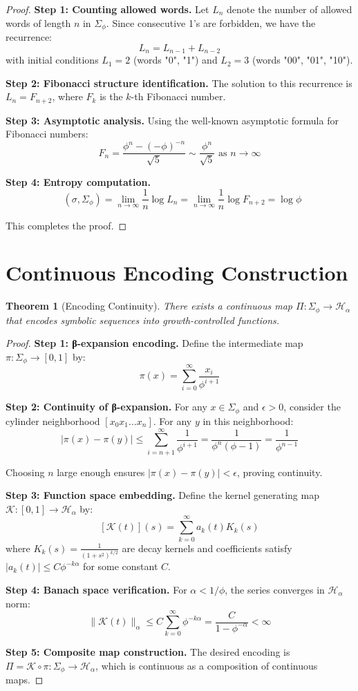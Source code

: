 \documentclass[12pt]{article}
\theoremstyle{plain}
\newtheorem{theorem}{Theorem}[section]
\theoremstyle{definition}
\DeclareMathOperator{\htop}{h_{top}}
\begin{document}
\begin{proof}
\textbf{Step 1: Counting allowed words.}
Let $L_n$ denote the number of allowed words of length $n$ in $\Sigma_\phi$. Since consecutive 1's are forbidden, we have the recurrence:
$$L_n = L_{n-1} + L_{n-2}$$
with initial conditions $L_1 = 2$ (words "0", "1") and $L_2 = 3$ (words "00", "01", "10").

\textbf{Step 2: Fibonacci structure identification.}
The solution to this recurrence is $L_n = F_{n+2}$, where $F_k$ is the $k$-th Fibonacci number.

\textbf{Step 3: Asymptotic analysis.}
Using the well-known asymptotic formula for Fibonacci numbers:
$$F_n = \frac{\phi^n - (-\phi)^{-n}}{\sqrt{5}} \sim \frac{\phi^n}{\sqrt{5}} \text{ as } n \to \infty$$

\textbf{Step 4: Entropy computation.}
$$\htop(\sigma, \Sigma_\phi) = \lim_{n \to \infty} \frac{1}{n} \log L_n = \lim_{n \to \infty} \frac{1}{n} \log F_{n+2} = \log \phi$$

This completes the proof.
\end{proof}

\section{Continuous Encoding Construction}

\begin{theorem}[Encoding Continuity]
\label{thm:encoding}
There exists a continuous map $\Pi: \Sigma_\phi \to \mathcal{H}_\alpha$ that encodes symbolic sequences into growth-controlled functions.
\end{theorem}

\begin{proof}
\textbf{Step 1: β-expansion encoding.}
Define the intermediate map $\pi: \Sigma_\phi \to [0,1]$ by:
$$\pi(x) = \sum_{i=0}^\infty \frac{x_i}{\phi^{i+1}}$$

\textbf{Step 2: Continuity of β-expansion.}
For any $x \in \Sigma_\phi$ and $\epsilon > 0$, consider the cylinder neighborhood $[x_0 x_1 \ldots x_n]$. For any $y$ in this neighborhood:
$$|\pi(x) - \pi(y)| \leq \sum_{i=n+1}^\infty \frac{1}{\phi^{i+1}} = \frac{1}{\phi^n(\phi-1)} = \frac{1}{\phi^{n-1}}$$

Choosing $n$ large enough ensures $|\pi(x) - \pi(y)| < \epsilon$, proving continuity.

\textbf{Step 3: Function space embedding.}
Define the kernel generating map $\mathcal{K}: [0,1] \to \mathcal{H}_\alpha$ by:
$$[\mathcal{K}(t)](s) = \sum_{k=0}^\infty a_k(t) K_k(s)$$
where $K_k(s) = \frac{1}{(1+s^2)^{k/2}}$ are decay kernels and coefficients satisfy $|a_k(t)| \leq C \phi^{-k\alpha}$ for some constant $C$.

\textbf{Step 4: Banach space verification.}
For $\alpha < 1/\phi$, the series converges in $\mathcal{H}_\alpha$ norm:
$$\|\mathcal{K}(t)\|_\alpha \leq C \sum_{k=0}^\infty \phi^{-k\alpha} = \frac{C}{1 - \phi^{-\alpha}} < \infty$$

\textbf{Step 5: Composite map construction.}
The desired encoding is $\Pi = \mathcal{K} \circ \pi: \Sigma_\phi \to \mathcal{H}_\alpha$, which is continuous as a composition of continuous maps.
\end{proof}
\end{document}
